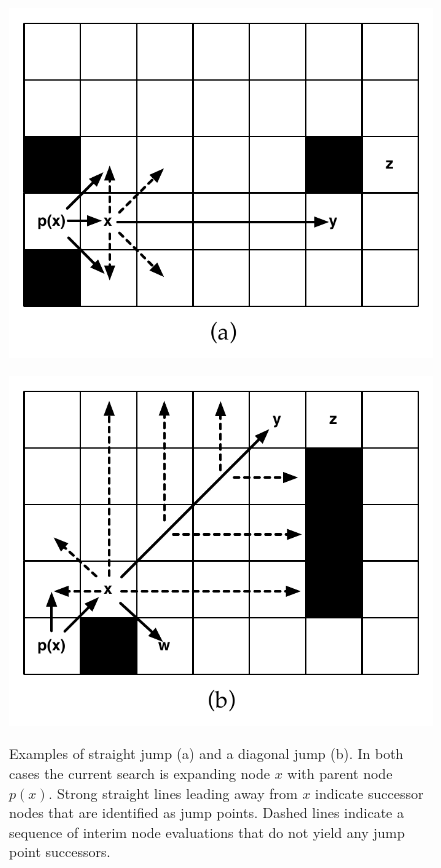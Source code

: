 \begin{figure}[tb]
\centering
\begin{minipage}[tb]{0.49\columnwidth}
		   \includegraphics[width=\columnwidth, trim = 4mm 0mm 0mm 0mm]
			{chapter_jps/diagrams/jump_straight.pdf}
\label{fig::jps::jump_straight}
\end{minipage}
\begin{minipage}[tb]{0.49\columnwidth}
		   \includegraphics[width=\columnwidth, trim = 0mm 0mm 4mm 0mm]
			{chapter_jps/diagrams/jump_diagonal.pdf}
\label{fig::jps::jump_straight}
\end{minipage}
\label{fig::jps::jumppoints}
\vspace{-2em}
\caption{Examples of straight jump (a) and a diagonal jump (b).
In both cases the current search is expanding node $x$ with parent node $p(x)$.
Strong straight lines leading away from $x$ indicate successor nodes that are 
identified as jump points.
Dashed lines indicate a sequence of interim node evaluations that do not yield any
jump point successors.}
\label{fig::jps::jumppoints}
\end{figure}
